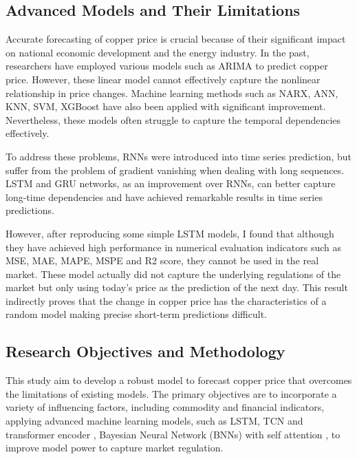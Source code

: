 \documentclass[final-report]{report-template}
\begin{document}
\subsection{Advanced Models and Their Limitations}
Accurate forecasting of copper price is crucial because of their significant impact on national economic development and the energy industry. In the past, researchers have employed various models such as ARIMA \cite{Asteriou2016ARIMAMA} to predict copper price. However, these linear model cannot effectively capture the nonlinear relationship in price changes. Machine learning methods such as NARX\cite{lin1996learning,diaconescu2008use,yan2013substructure}, ANN\cite{ZHANG2021102189,WANG2019101414}, KNN\cite{altman1992introduction}, SVM\cite{ZHANG2021102189}, XGBoost \cite{frigola2013integrated,breiman2001random} have also been applied with significant improvement.  Nevertheless, these models often struggle to capture the temporal dependencies effectively.

To address these problems, RNNs \cite{rumelhart1986learning1} were introduced into time series prediction, but suffer from the problem of gradient vanishing \cite{rumelhart1986learning} when dealing with long sequences. LSTM  \cite{hochreiter1997long,shi2015convolutional}and GRU networks, as an improvement over RNNs, can better capture long-time dependencies and have achieved remarkable results in time series predictions. 

However, after reproducing some simple LSTM models, I found that although they have achieved high performance in numerical evaluation indicators such as MSE, MAE, MAPE, MSPE and R2 score, they cannot be used in the real market. These model actually did not capture the underlying regulations of the market but only using today's price as the prediction of the next day. This result indirectly proves that the change in copper price has the characteristics of a random model making precise short-term predictions difficult.

\subsection{Research Objectives and Methodology}
This study aim to develop a robust model to forecast copper price that overcomes the limitations of existing models. The primary objectives are to incorporate a variety of influencing factors, including commodity and financial indicators, applying advanced machine learning models, such as LSTM, TCN \cite{lea2016temporalconvolutionalnetworksunified} and transformer encoder \cite{wen2023transformers}, Bayesian Neural Network (BNNs) \cite{item_79a95918d094486381eddd0e003bcd84}
 with self attention \cite{vaswani2017attention}, to improve model power to capture market regulation. 
\end{document}

